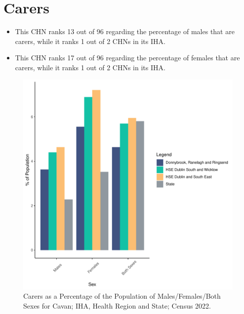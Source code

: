 \documentclass{article}
\begin{document}
\section{Carers}\label{sect:Carers}
\begin{itemize}
\item This CHN ranks  13 out of 96 regarding the percentage of males that are carers, while it ranks   1 out of 2 CHNs in its IHA.
\item This CHN ranks  17 out of 96 regarding the percentage of females that are carers, while it ranks   1 out of 2 CHNs in its IHA.
\end{itemize}
\begin{figure}[H]
	\centering
	\includegraphics[width = 150mm]{../figures/CareED.pdf}
	\caption{Carers as a Percentage of the Population of Males/Females/Both Sexes for Cavan; IHA, Health Region and State; Census 2022.}
	\label{fig:2ae19629-1a6a-13a3-e055-000000000001}
	\end{figure}
\end{document}
